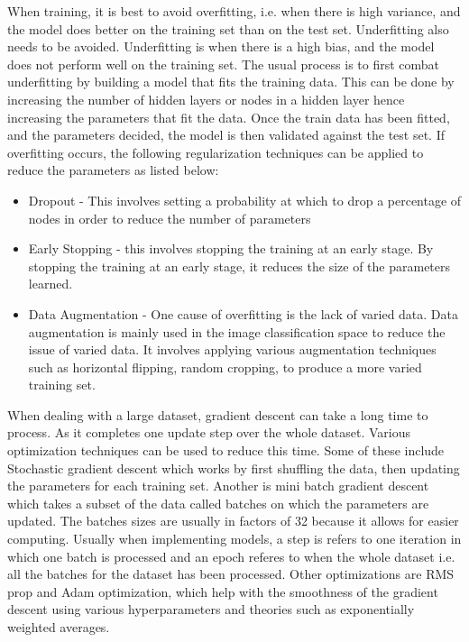When training, it is best to avoid overfitting, i.e. when there is high variance, and the model does better on the training set than on the test set. Underfitting also needs to be avoided. 
Underfitting is when there is a high bias, and the model does not perform well on the training set. 
The usual process is to first combat underfitting by building a model that fits the training data. This can be done by increasing the number of hidden layers or nodes in a hidden layer hence increasing the parameters that fit the data.  Once the train data has been fitted, and the parameters decided, the model is then validated against the test set. If overfitting occurs, the following regularization techniques can be applied to reduce the parameters as listed below:
\begin{itemize}
    \item Dropout - This involves setting a probability at which to drop a percentage of nodes in order to reduce the number of parameters 
    \item Early Stopping -  this involves stopping the training at an early stage. By stopping the training at an early stage, it reduces the size of the parameters learned. 
    \item Data Augmentation - One cause of overfitting is the lack of varied data. Data augmentation is mainly used in the image classification space to reduce the issue of varied data. It involves applying various augmentation techniques such as horizontal flipping, random cropping, to produce a more varied training set. 
\end{itemize}

When dealing with a large dataset, gradient descent can take a long time to process. As it completes one update step over the whole dataset. Various optimization techniques can be used to reduce this time. Some of these include Stochastic gradient descent which works by first shuffling the data, then updating the parameters for each training set. Another is mini batch gradient descent which takes a subset of the data called batches on which the parameters are updated. The batches sizes are usually in factors of 32 because it allows for easier computing. Usually when implementing models, a step is refers to one iteration in which one batch is processed and an epoch  referes to when the whole dataset i.e. all the batches for the dataset has been processed. Other optimizations are RMS prop and Adam optimization, which help with the smoothness of the gradient descent using various hyperparameters and theories such as exponentially weighted averages.
 
